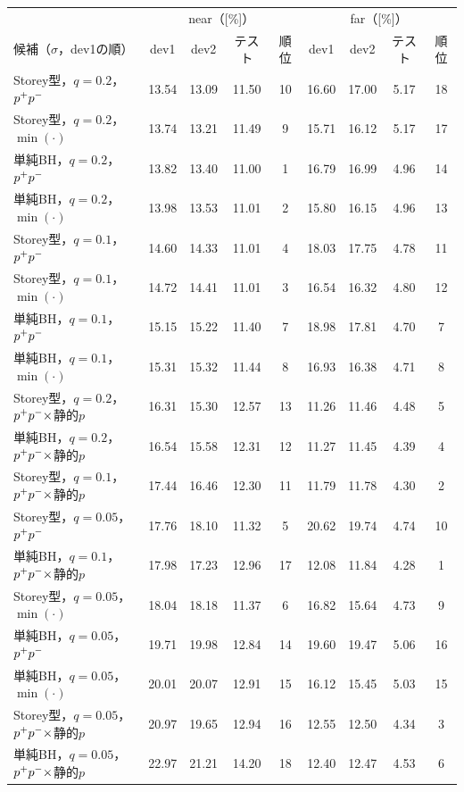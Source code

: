 {\fontsize{6.4pt}{7.5pt}\selectfont\renewcommand{\arraystretch}{1.0}%
\setlength{\tabcolsep}{2.4pt}\begin{tabular}{@{}l|cccc|cccc@{}}
\hline
\rule[-2.0pt]{0pt}{8.2pt} & \multicolumn{4}{c|}{near（\FPR{}[\%]）} & \multicolumn{4}{c}{far（\FPR{}[\%]）} \\
\rule[-2.0pt]{0pt}{8.2pt}候補（$\sigma$，dev1の順） & dev1 & dev2 & テスト & 順位 & dev1 & dev2 & テスト & 順位 \\
\hline
Storey型，$q{=}0.2$，$p^{+}p^{-}$ & 13.54 & 13.09 & 11.50 & 10 & 16.60 & 17.00 & 5.17 & 18 \\
Storey型，$q{=}0.2$，$\min(\cdot)$ & 13.74 & 13.21 & 11.49 & 9 & 15.71 & 16.12 & 5.17 & 17 \\
単純BH，$q{=}0.2$，$p^{+}p^{-}$ & 13.82 & 13.40 & 11.00 & 1 & 16.79 & 16.99 & 4.96 & 14 \\
単純BH，$q{=}0.2$，$\min(\cdot)$ & 13.98 & 13.53 & 11.01 & 2 & 15.80 & 16.15 & 4.96 & 13 \\
Storey型，$q{=}0.1$，$p^{+}p^{-}$ & 14.60 & 14.33 & 11.01 & 4 & 18.03 & 17.75 & 4.78 & 11 \\
Storey型，$q{=}0.1$，$\min(\cdot)$ & 14.72 & 14.41 & 11.01 & 3 & 16.54 & 16.32 & 4.80 & 12 \\
単純BH，$q{=}0.1$，$p^{+}p^{-}$ & 15.15 & 15.22 & 11.40 & 7 & 18.98 & 17.81 & 4.70 & 7 \\
単純BH，$q{=}0.1$，$\min(\cdot)$ & 15.31 & 15.32 & 11.44 & 8 & 16.93 & 16.38 & 4.71 & 8 \\
Storey型，$q{=}0.2$，$p^{+}p^{-}\times$静的$p$ & 16.31 & 15.30 & 12.57 & 13 & 11.26 & 11.46 & 4.48 & 5 \\
単純BH，$q{=}0.2$，$p^{+}p^{-}\times$静的$p$ & 16.54 & 15.58 & 12.31 & 12 & 11.27 & 11.45 & 4.39 & 4 \\
Storey型，$q{=}0.1$，$p^{+}p^{-}\times$静的$p$ & 17.44 & 16.46 & 12.30 & 11 & 11.79 & 11.78 & 4.30 & 2 \\
Storey型，$q{=}0.05$，$p^{+}p^{-}$ & 17.76 & 18.10 & 11.32 & 5 & 20.62 & 19.74 & 4.74 & 10 \\
単純BH，$q{=}0.1$，$p^{+}p^{-}\times$静的$p$ & 17.98 & 17.23 & 12.96 & 17 & 12.08 & 11.84 & 4.28 & 1 \\
Storey型，$q{=}0.05$，$\min(\cdot)$ & 18.04 & 18.18 & 11.37 & 6 & 16.82 & 15.64 & 4.73 & 9 \\
単純BH，$q{=}0.05$，$p^{+}p^{-}$ & 19.71 & 19.98 & 12.84 & 14 & 19.60 & 19.47 & 5.06 & 16 \\
単純BH，$q{=}0.05$，$\min(\cdot)$ & 20.01 & 20.07 & 12.91 & 15 & 16.12 & 15.45 & 5.03 & 15 \\
Storey型，$q{=}0.05$，$p^{+}p^{-}\times$静的$p$ & 20.97 & 19.65 & 12.94 & 16 & 12.55 & 12.50 & 4.34 & 3 \\
単純BH，$q{=}0.05$，$p^{+}p^{-}\times$静的$p$ & 22.97 & 21.21 & 14.20 & 18 & 12.40 & 12.47 & 4.53 & 6 \\
\hline
\end{tabular}}%
